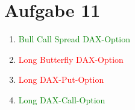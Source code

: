 \documentclass{article}
\begin{document}
	\section*{Aufgabe 11}
	\begin{enumerate}[label=(\alph*)]
		\item\textcolor{green}{Bull Call Spread DAX-Option}
		\item\textcolor{red}{Long Butterfly DAX-Option}
		\item\textcolor{red}{Long DAX-Put-Option}
		\item\textcolor{green}{Long DAX-Call-Option}
	\end{enumerate}
	
\end{document}
